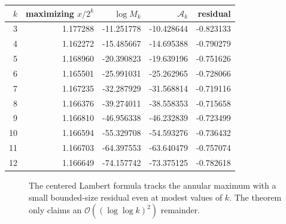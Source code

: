 \documentclass[11pt,oneside]{article}
\theoremstyle{definition}
\theoremstyle{remark}
\newcommand{\bigO}{\mathcal O}
\begin{document}
\begin{center}
\begin{tabular}{@{}rrrrr@{}}
\toprule
\(k\) & maximizing \(x/2^k\) & \(\log M_k\) & \(\mathcal A_k\) & residual \\
\midrule
3  & 1.177288 & -11.251778 & -10.428644 & -0.823133 \\
4  & 1.162272 & -15.485667 & -14.695388 & -0.790279 \\
5  & 1.168960 & -20.390823 & -19.639196 & -0.751626 \\
6  & 1.165501 & -25.991031 & -25.262965 & -0.728066 \\
7  & 1.167235 & -32.287929 & -31.568814 & -0.719116 \\
8  & 1.166376 & -39.274011 & -38.558353 & -0.715658 \\
9  & 1.166810 & -46.956338 & -46.232839 & -0.723499 \\
10 & 1.166594 & -55.329708 & -54.593276 & -0.736432 \\
11 & 1.166703 & -64.397553 & -63.640479 & -0.757074 \\
12 & 1.166649 & -74.157742 & -73.375125 & -0.782618 \\
\bottomrule
\end{tabular}
\end{center}

\begin{figure}[ht]
\centering
{}
\caption{The centered Lambert formula tracks the annular maximum with a
small bounded-size residual even at modest values of \(k\).  The theorem only
claims an \(\bigO((\log\log k)^2)\) remainder.}
\label{fig:numerical-comparison}
\end{figure}
\end{document}
